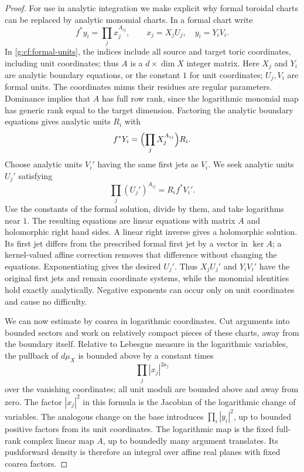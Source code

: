 \begin{proof}
For use in analytic integration we make explicit why formal toroidal
charts can be replaced by analytic monomial charts.  In a formal chart
write
\begin{equation}\label{g:cf:formal-units}
 f^*y_i=\prod_jx_j^{A_{ij}},\qquad
 x_j=X_jU_j,\quad y_i=Y_iV_i.
\end{equation}
In \eqref{g:cf:formal-units}, the indices include all source and
target toric coordinates, including unit coordinates; thus
$A$ is a $d\times\dim X$ integer matrix. Here $X_j$ and $Y_i$ are
analytic boundary equations, or the constant
$1$ for unit coordinates; $U_j,V_i$ are formal units.  The coordinates
minus their residues are regular parameters.  Dominance implies
that $A$ has full row rank, since the logarithmic monomial map has
generic rank equal to the target dimension.  Factoring the analytic
boundary equations gives analytic units $R_i$ with
\[
 f^*Y_i=\Bigl(\prod_jX_j^{A_{ij}}\Bigr)R_i.
\]
Choose analytic units $V_i'$ having the same first jets as $V_i$.
We seek analytic units $U_j'$ satisfying
\begin{equation}\label{g:cf:unit-equations}
 \prod_j(U_j')^{A_{ij}}=R_i f^*V_i'.
\end{equation}
Use the constants of the formal solution, divide by them, and take
logarithms near $1$.  The resulting equations are linear equations
with matrix $A$ and holomorphic right hand sides.  A linear right
inverse gives a holomorphic solution.  Its first jet differs from
the prescribed formal first jet by a vector in $\ker A$; a
kernel-valued affine correction removes that difference without
changing the equations.  Exponentiating gives the desired $U_j'$.
Thus $X_jU_j'$ and $Y_iV_i'$ have the original first jets and remain
coordinate systems, while the monomial identities hold exactly
analytically.  Negative exponents can occur only on unit
coordinates and cause no difficulty.

We can now estimate by coarea in logarithmic coordinates.  Cut
arguments into bounded sectors and work on relatively compact
pieces of these charts, away from the boundary itself.  Relative
to Lebesgue measure in the logarithmic variables, the pullback
of $d\mu_X$ is bounded above by a constant times
\[
 \prod_j|x_j|^{2a_j}
\]
over the vanishing coordinates; all unit moduli are bounded above
and away from zero.  The factor $|x_j|^2$ in this formula is the
Jacobian of the logarithmic change of variables.  The analogous
change on the base introduces $\prod_i|y_i|^2$, up to bounded
positive factors from its unit coordinates.  The logarithmic
map is the fixed full-rank complex linear map $A$, up to boundedly
many argument translates.  Its pushforward density is therefore
an integral over affine real planes with fixed coarea factors.


\end{proof}
